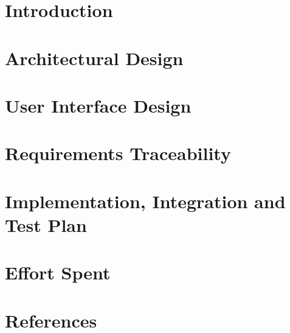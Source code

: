 \documentclass{config/PoliMi3i_thesis}
\numberwithin{algorithm}{chapter}
\begin{document}
\pagebreak
\chapter{Introduction}


\pagebreak
\chapter{Architectural Design}


\pagebreak
\chapter{User Interface Design}


\pagebreak
\chapter{Requirements Traceability}


\pagebreak
\chapter{Implementation, Integration and Test Plan}


\pagebreak
\chapter{Effort Spent}


\pagebreak
\chapter{References}


\pagebreak
\listoffigures
\end{document}

